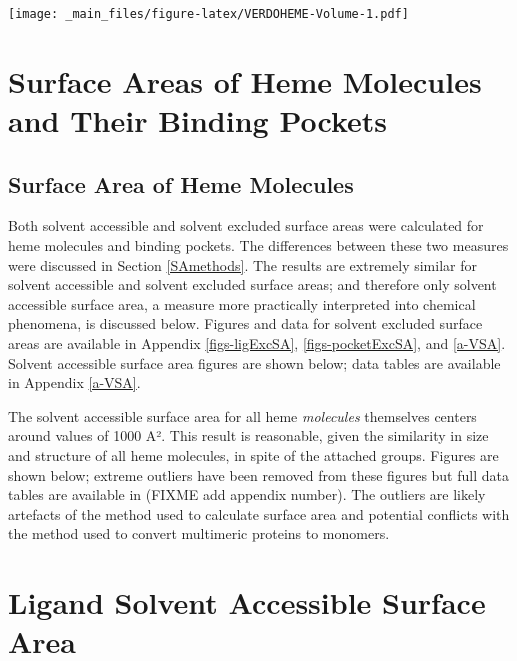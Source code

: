\documentclass[a4paper, nobind]{templates/ociamthesis}
\let\origfigure\figure
\let\endorigfigure\endfigure
\renewenvironment{figure}[1][2] {
    \expandafter\origfigure\expandafter[H]
} {
    \endorigfigure
}
\begin{document}
\begin{figure}
\centering
\texttt{[image: \_main\_files/figure-latex/VERDOHEME-Volume-1.pdf]}
\caption{\label{fig:VERDOHEME-Volume}VERDOHEME: Volume}
\end{figure}

\hypertarget{surface-areas-of-heme-molecules-and-their-binding-pockets}{%
\section{Surface Areas of Heme Molecules and Their Binding Pockets}\label{surface-areas-of-heme-molecules-and-their-binding-pockets}}

\hypertarget{surface-area-of-heme-molecules}{%
\subsection{Surface Area of Heme Molecules}\label{surface-area-of-heme-molecules}}

Both solvent accessible and solvent excluded surface areas were calculated for heme molecules and binding pockets. The differences between these two measures were discussed in Section \ref{SAmethods}. The results are extremely similar for solvent accessible and solvent excluded surface areas; and therefore only solvent accessible surface area, a measure more practically interpreted into chemical phenomena, is discussed below. Figures and data for solvent excluded surface areas are available in Appendix \ref{figs-ligExcSA}, \ref{figs-pocketExcSA}, and \ref{a-VSA}. Solvent accessible surface area figures are shown below; data tables are available in Appendix \ref{a-VSA}.

The solvent accessible surface area for all heme \emph{molecules} themselves centers around values of 1000 A². This result is reasonable, given the similarity in size and structure of all heme molecules, in spite of the attached groups. Figures are shown below; extreme outliers have been removed from these figures but full data tables are available in (FIXME add appendix number). The outliers are likely artefacts of the method used to calculate surface area and potential conflicts with the method used to convert multimeric proteins to monomers.

\hypertarget{figs-ligAccSA}{%
\section{Ligand Solvent Accessible Surface Area}\label{figs-ligAccSA}}
\end{document}
